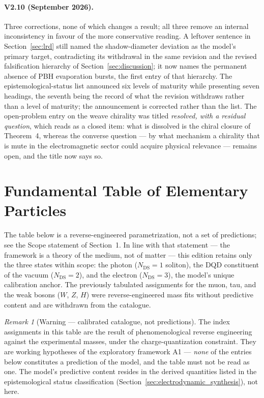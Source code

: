 \documentclass[11pt,a4paper]{article}
\theoremstyle{plain}
\theoremstyle{remark}
\newtheorem*{remarkstar}{Remark}
\newcommand{\Ncd}{\ensuremath{N_{\mathrm{DS}}}}
\begin{document}
\paragraph{V2.10 (September 2026).} Three corrections, none of which changes a result; all three remove an internal inconsistency in favour of the more conservative reading. A leftover sentence in Section~\ref{sec:lrd} still named the shadow-diameter deviation as the model's primary target, contradicting its withdrawal in the same revision and the revised falsification hierarchy of Section~\ref{sec:discussion}; it now names the permanent absence of PBH evaporation bursts, the first entry of that hierarchy. The epistemological-status list announced six levels of maturity while presenting seven headings, the seventh being the record of what the revision withdraws rather than a level of maturity; the announcement is corrected rather than the list. The open-problem entry on the weave chirality was titled \emph{resolved, with a residual question}, which reads as a closed item: what is dissolved is the chiral closure of Theorem~4, whereas the converse question --- by what mechanism a chirality that is mute in the electromagnetic sector could acquire physical relevance --- remains open, and the title now says so.

\section{Fundamental Table of Elementary Particles}
The table below is a reverse-engineered parametrization, not a set of predictions; see the Scope statement of Section~1. In line with that statement --- the framework is a theory of the medium, not of matter --- this edition retains only the three states within scope: the photon ($\Ncd=1$ soliton), the DQD constituent of the vacuum ($\Ncd=2$), and the electron ($\Ncd=3$), the model's unique calibration anchor. The previously tabulated assignments for the muon, tau, and the weak bosons ($W$, $Z$, $H$) were reverse-engineered mass fits without predictive content and are withdrawn from the catalogue.

\begin{remarkstar}[Warning --- calibrated catalogue, not predictions]
The index assignments in this table are the result of phenomenological reverse engineering against the experimental masses, under the charge-quantization constraint. They are working hypotheses of the exploratory framework A1 --- \emph{none} of the entries below constitutes a prediction of the model, and the table must not be read as one. The model's predictive content resides in the derived quantities listed in the epistemological status classification (Section~\ref{sec:electrodynamic_synthesis}), not here.
\end{remarkstar}
\end{document}
